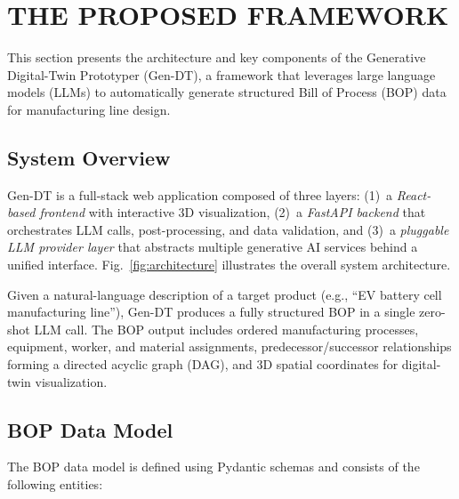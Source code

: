 
\section{THE PROPOSED FRAMEWORK}
\label{sec:framework}

This section presents the architecture and key components of the Generative Digital-Twin Prototyper (Gen-DT), a framework that leverages large language models (LLMs) to automatically generate structured Bill of Process (BOP) data for manufacturing line design.

\subsection{System Overview}

Gen-DT is a full-stack web application composed of three layers: (1)~a \textit{React-based frontend} with interactive 3D visualization, (2)~a \textit{FastAPI backend} that orchestrates LLM calls, post-processing, and data validation, and (3)~a \textit{pluggable LLM provider layer} that abstracts multiple generative AI services behind a unified interface.
Fig.~\ref{fig:architecture} illustrates the overall system architecture.

Given a natural-language description of a target product (e.g., ``EV battery cell manufacturing line''), Gen-DT produces a fully structured BOP in a single zero-shot LLM call.
The BOP output includes ordered manufacturing processes, equipment, worker, and material assignments, predecessor/successor relationships forming a directed acyclic graph (DAG), and 3D spatial coordinates for digital-twin visualization.

\subsection{BOP Data Model}

The BOP data model is defined using Pydantic schemas and consists of the following entities:


